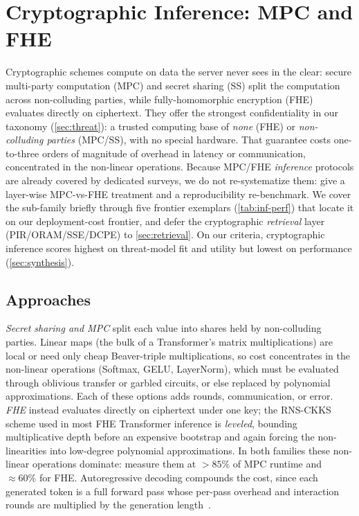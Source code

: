 \section{Cryptographic Inference: MPC and FHE}
\label{sec:crypto}


Cryptographic schemes compute on data the server never sees in the clear: secure multi-party
computation (MPC) and secret sharing (SS) split the computation across non-colluding parties,
while fully-homomorphic encryption (FHE) evaluates directly on ciphertext. They offer the
strongest confidentiality in our taxonomy (\cref{sec:threat}): a trusted computing base of
\emph{none} (FHE) or \emph{non-colluding parties} (MPC/SS), with no special hardware. That guarantee
costs one-to-three orders of magnitude of overhead in latency or communication, concentrated in the
non-linear operations. Because MPC/FHE \emph{inference} protocols are already covered by dedicated
surveys, we do not re-systematize them: \citet{li_pti_survey} give a layer-wise MPC-vs-FHE treatment
and \citet{chen_sok_pti} a reproducibility re-benchmark. We cover the sub-family briefly through five
frontier exemplars (\cref{tab:inf-perf}) that locate it on our deployment-cost frontier, and defer
the cryptographic \emph{retrieval} layer (PIR/ORAM/SSE/DCPE) to \cref{sec:retrieval}.
On our criteria, cryptographic inference scores highest on threat-model fit and utility but lowest
on performance (\cref{sec:synthesis}).

\subsection{Approaches}
\label{ssec:crypto-approach}
\emph{Secret sharing and MPC} split each value into shares held by non-colluding parties. Linear
maps (the bulk of a Transformer's matrix multiplications) are local or need only cheap
Beaver-triple multiplications, so cost concentrates in the non-linear operations (Softmax, GELU,
LayerNorm), which must be evaluated through oblivious transfer or garbled circuits, or else replaced
by polynomial approximations. Each of these options adds rounds, communication, or error.
\emph{FHE} instead evaluates directly on ciphertext under one key; the RNS-CKKS scheme used in most
FHE Transformer inference is \emph{leveled}, bounding multiplicative depth before an expensive
bootstrap and again forcing the non-linearities into low-degree polynomial approximations. In both
families these non-linear operations dominate: \citet{li_pti_survey} measure them at ${>}85\%$ of
MPC runtime and ${\approx}60\%$ for FHE. Autoregressive decoding compounds the cost, since each
generated token is a full forward pass whose per-pass overhead and interaction rounds are multiplied
by the generation length~\citep{andreoletti_ppi_practice}.

